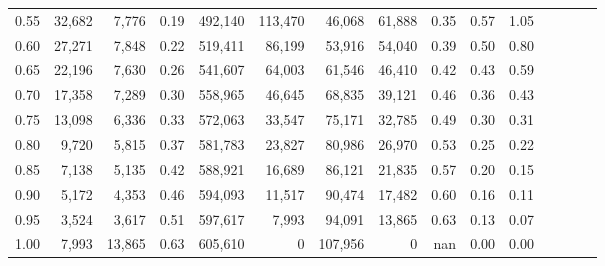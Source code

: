 \begin{tabular}{rrrcrrrrrrrrrrr}
0.55 &  32,682 &   7,776 &                                       0.19 &  492,140 &  113,470 &   46,068 &   61,888 &  0.35 &  0.57 &                         1.05 \\
0.60 &  27,271 &   7,848 &                                       0.22 &  519,411 &   86,199 &   53,916 &   54,040 &  0.39 &  0.50 &                         0.80 \\
0.65 &  22,196 &   7,630 &                                       0.26 &  541,607 &   64,003 &   61,546 &   46,410 &  0.42 &  0.43 &                         0.59 \\
0.70 &  17,358 &   7,289 &                                       0.30 &  558,965 &   46,645 &   68,835 &   39,121 &  0.46 &  0.36 &                         0.43 \\
0.75 &  13,098 &   6,336 &                                       0.33 &  572,063 &   33,547 &   75,171 &   32,785 &  0.49 &  0.30 &                         0.31 \\
0.80 &   9,720 &   5,815 &                                       0.37 &  581,783 &   23,827 &   80,986 &   26,970 &  0.53 &  0.25 &                         0.22 \\
0.85 &   7,138 &   5,135 &                                       0.42 &  588,921 &   16,689 &   86,121 &   21,835 &  0.57 &  0.20 &                         0.15 \\
0.90 &   5,172 &   4,353 &                                       0.46 &  594,093 &   11,517 &   90,474 &   17,482 &  0.60 &  0.16 &                         0.11 \\
0.95 &   3,524 &   3,617 &                                       0.51 &  597,617 &    7,993 &   94,091 &   13,865 &  0.63 &  0.13 &                         0.07 \\
1.00 &   7,993 &  13,865 &                                       0.63 &  605,610 &        0 &  107,956 &        0 &   nan &  0.00 &                         0.00 \\
\bottomrule
\end{tabular}
